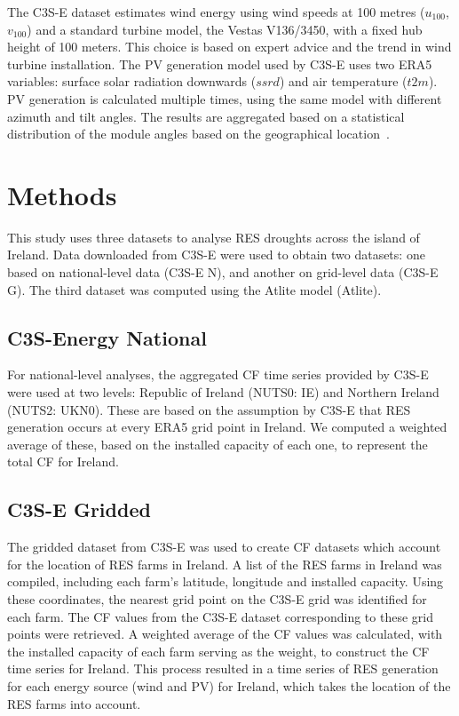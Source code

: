 \documentclass[preprint, 12pt]{elsarticle}
\begin{document}
The C3S-E dataset estimates wind energy using wind speeds at 100 metres ($u_{100}$, $v_{100}$) and a standard turbine model, the Vestas V136/3450, with a fixed hub height of 100 meters. This choice is based on expert advice and the trend in wind turbine installation. The PV generation model used by C3S-E uses two ERA5 variables: surface solar radiation downwards ($ssrd$) and air temperature ($t2m$). PV generation is calculated multiple times, using the same model with different azimuth and tilt angles. The results are aggregated based on a statistical distribution of the module angles based on the geographical location~\citep{saintdrenan2018solar}.

\section{Methods}
\label{sec:Methods}

This study uses three datasets to analyse RES droughts across the island of Ireland. Data downloaded from C3S-E were used to obtain two datasets: one based on national-level data (C3S-E N), and another on grid-level data (C3S-E G). The third dataset was computed using the Atlite model (Atlite).

\subsection{C3S-Energy National}
\label{sec:c3se_n}

For national-level analyses, the aggregated CF time series provided by C3S-E were used at two levels: Republic of Ireland (NUTS0: IE) and Northern Ireland (NUTS2: UKN0). These are based on the assumption by C3S-E that RES generation occurs at every ERA5 grid point in Ireland. We computed a weighted average of these, based on the installed capacity of each one, to represent the total CF for Ireland.

\subsection{C3S-E Gridded}
\label{sec:c3se_g}

The gridded dataset from C3S-E was used to create CF datasets which account for the location of RES farms in Ireland. A list of the RES farms in Ireland was compiled, including each farm’s latitude, longitude and installed capacity. Using these coordinates, the nearest grid point on the C3S-E grid was identified for each farm. The CF values from the C3S-E dataset corresponding to these grid points were retrieved. A weighted average of the CF values was calculated, with the installed capacity of each farm serving as the weight, to construct the CF time series for Ireland. This process resulted in a time series of RES generation for each energy source (wind and PV) for Ireland, which takes the location of the RES farms into account.
\end{document}
